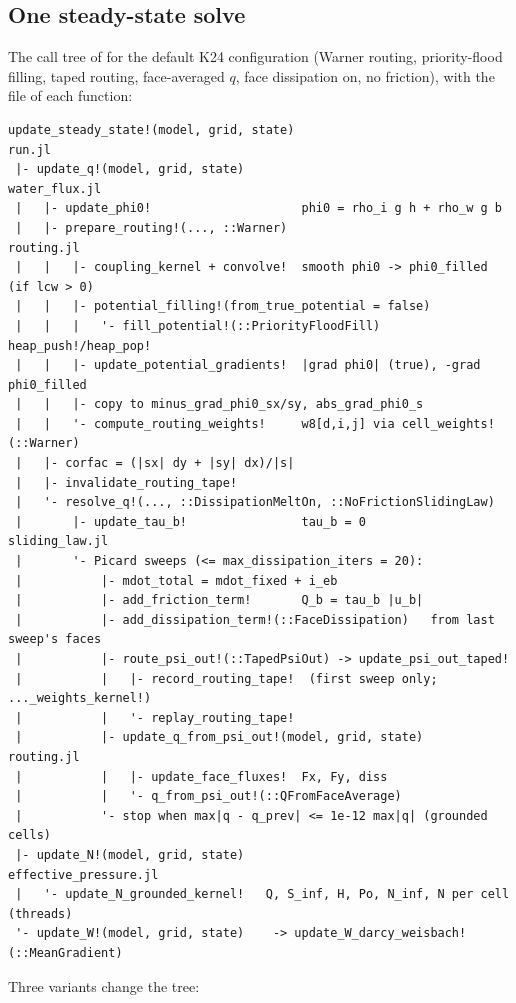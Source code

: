 \subsection{One steady-state solve}\label{life:solve}
The call tree of  for the default K24 configuration (Warner routing, priority-flood
filling, taped routing, face-averaged $q$, face dissipation on, no friction), with the file of each function:
{\small
\begin{verbatim}
update_steady_state!(model, grid, state)                          run.jl
 |- update_q!(model, grid, state)                                 water_flux.jl
 |   |- update_phi0!                     phi0 = rho_i g h + rho_w g b
 |   |- prepare_routing!(..., ::Warner)                           routing.jl
 |   |   |- coupling_kernel + convolve!  smooth phi0 -> phi0_filled (if lcw > 0)
 |   |   |- potential_filling!(from_true_potential = false)
 |   |   |   '- fill_potential!(::PriorityFloodFill)  heap_push!/heap_pop!
 |   |   |- update_potential_gradients!  |grad phi0| (true), -grad phi0_filled
 |   |   |- copy to minus_grad_phi0_sx/sy, abs_grad_phi0_s
 |   |   '- compute_routing_weights!     w8[d,i,j] via cell_weights!(::Warner)
 |   |- corfac = (|sx| dy + |sy| dx)/|s|
 |   |- invalidate_routing_tape!
 |   '- resolve_q!(..., ::DissipationMeltOn, ::NoFrictionSlidingLaw)
 |       |- update_tau_b!                tau_b = 0                  sliding_law.jl
 |       '- Picard sweeps (<= max_dissipation_iters = 20):
 |           |- mdot_total = mdot_fixed + i_eb
 |           |- add_friction_term!       Q_b = tau_b |u_b|
 |           |- add_dissipation_term!(::FaceDissipation)   from last sweep's faces
 |           |- route_psi_out!(::TapedPsiOut) -> update_psi_out_taped!
 |           |   |- record_routing_tape!  (first sweep only; ..._weights_kernel!)
 |           |   '- replay_routing_tape!
 |           |- update_q_from_psi_out!(model, grid, state)         routing.jl
 |           |   |- update_face_fluxes!  Fx, Fy, diss
 |           |   '- q_from_psi_out!(::QFromFaceAverage)
 |           '- stop when max|q - q_prev| <= 1e-12 max|q| (grounded cells)
 |- update_N!(model, grid, state)                                 effective_pressure.jl
 |   '- update_N_grounded_kernel!   Q, S_inf, H, Po, N_inf, N per cell (threads)
 '- update_W!(model, grid, state)    -> update_W_darcy_weisbach!(::MeanGradient)
\end{verbatim}}
Three variants change the tree:
